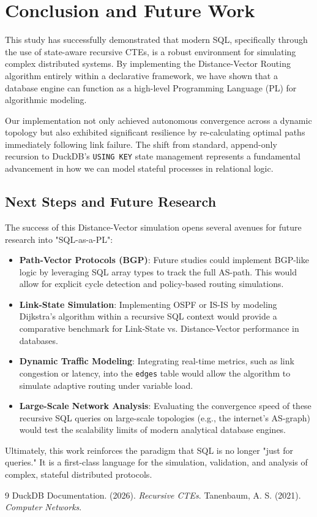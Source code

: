 \documentclass[twocolumn,a4paper,10pt]{article}
\begin{document}
\section{Conclusion and Future Work}
This study has successfully demonstrated that modern SQL, specifically through the use of state-aware recursive CTEs, is a robust environment for simulating complex distributed systems. By implementing the Distance-Vector Routing algorithm entirely within a declarative framework, we have shown that a database engine can function as a high-level Programming Language (PL) for algorithmic modeling. 

Our implementation not only achieved autonomous convergence across a dynamic topology but also exhibited significant resilience by re-calculating optimal paths immediately following link failure. The shift from standard, append-only recursion to DuckDB’s \texttt{USING KEY} state management represents a fundamental advancement in how we can model stateful processes in relational logic.

\subsection{Next Steps and Future Research}
The success of this Distance-Vector simulation opens several avenues for future research into "SQL-as-a-PL":
\begin{itemize}
    \item \textbf{Path-Vector Protocols (BGP)}: Future studies could implement BGP-like logic by leveraging SQL array types to track the full AS-path. This would allow for explicit cycle detection and policy-based routing simulations.
    \item \textbf{Link-State Simulation}: Implementing OSPF or IS-IS by modeling Dijkstra’s algorithm within a recursive SQL context would provide a comparative benchmark for Link-State vs. Distance-Vector performance in databases.
    \item \textbf{Dynamic Traffic Modeling}: Integrating real-time metrics, such as link congestion or latency, into the \texttt{edges} table would allow the algorithm to simulate adaptive routing under variable load.
    \item \textbf{Large-Scale Network Analysis}: Evaluating the convergence speed of these recursive SQL queries on large-scale topologies (e.g., the internet's AS-graph) would test the scalability limits of modern analytical database engines.
\end{itemize}

Ultimately, this work reinforces the paradigm that SQL is no longer "just for queries." It is a first-class language for the simulation, validation, and analysis of complex, stateful distributed protocols.

\begin{thebibliography}{9}
 DuckDB Documentation. (2026). \textit{Recursive CTEs}.
 Tanenbaum, A. S. (2021). \textit{Computer Networks}.
\end{thebibliography}
\end{document}
